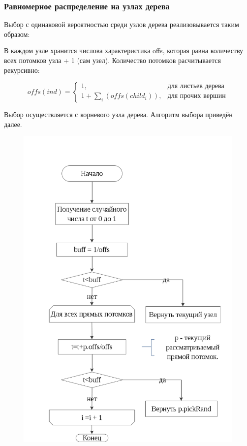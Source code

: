 \clearpage
\subsubsection{Равномерное распределение на узлах дерева}

Выбор с одинаковой вероятностью среди узлов дерева реализовывается таким образом:

В каждом узле хранится числова характеристика offs, которая равна количеству всех потомков узла + 1 (сам узел). Количество потомков расчитывается рекурсивно:

\begin{equation}
\label{equation:goodNodesEq3}
offs(ind) = \begin{cases} 1, & \mbox{для листьев дерева} \\ 1 + \sum_i(offs(child_i)), & \mbox{для прочих вершин} \end{cases}
\end{equation}

Выбор осуществляется с корневого узла дерева. Алгоритм выбора приведён далее.

\clearpage
\begin{figure}[!h]
\centering
\includegraphics[scale=0.7]{research/pics/12.png}
\label{figure:randomPick}
\end{figure}

